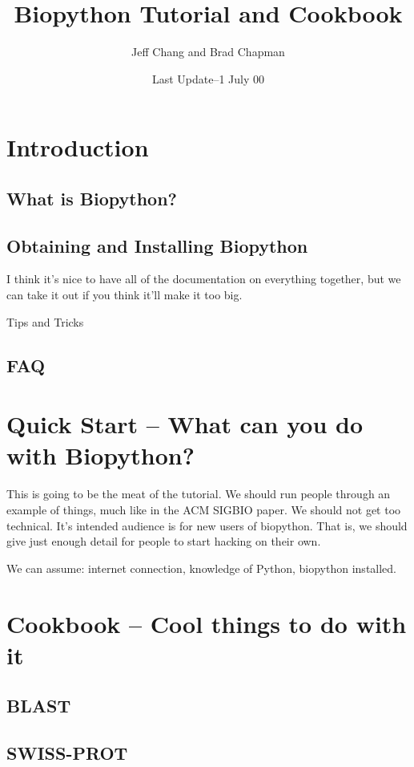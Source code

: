 \documentclass[dvips]{article}
\begin{document}
\title{Biopython
Tutorial and Cookbook}
\author{Jeff Chang and Brad Chapman}
\date{Last
Update--1 July 00}

\section{Introduction}

\subsection{What is Biopython?}

\subsection{Obtaining and Installing Biopython}

I think it's nice to have all of the documentation on everything
together, but we can take it out if you think it'll make it too big.

Tips and Tricks

\subsection{FAQ}



\section{Quick Start -- 
What can you do with Biopython?}

This is going to be the meat of the tutorial.  We should run people
through an example of things, much like in the ACM SIGBIO paper.  We
should not get too technical.  It's intended audience is for new users
of biopython.  That is, we should give just enough detail for people
to start hacking on their own.

We can assume: internet connection, knowledge of Python, biopython
installed.



\section{Cookbook -- Cool things to do with it}

\subsection{BLAST}

\subsection{SWISS-PROT}
\end{document}
